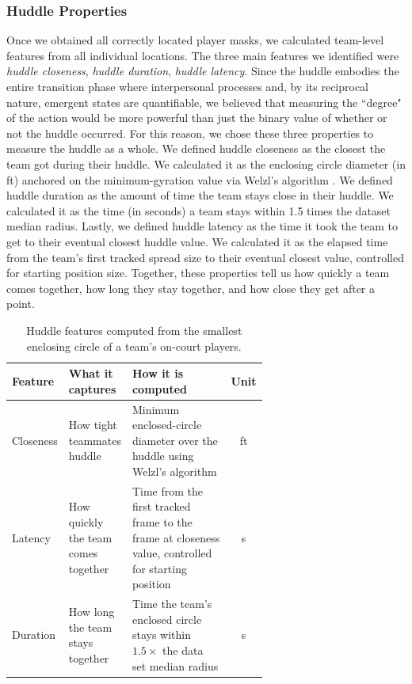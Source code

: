 \documentclass[12pt]{article}          %
\begin{document}
\subsubsection{Huddle Properties}
Once we obtained all correctly located player masks, we calculated team-level features from all individual locations. The three main features we identified were \textit{huddle closeness}, \textit{huddle duration}, \textit{huddle latency}. Since the huddle embodies the entire transition phase where interpersonal processes and, by its reciprocal nature, emergent states are quantifiable, we believed that measuring the ``degree" of the action would be more powerful than just the binary value of whether or not the huddle occurred. For this reason, we chose these three properties to measure the huddle as a whole. We defined huddle closeness as the closest the team got during their huddle. We calculated it as the enclosing circle diameter (in ft) anchored on the minimum-gyration value via Welzl's algorithm \citep{welzl1991smallest}. We defined huddle duration as the amount of time the team stays close in their huddle. We calculated it as the time (in seconds) a team stays within 1.5 times the dataset median radius. Lastly, we defined huddle latency as the time it took the team to get to their eventual closest huddle value. We calculated it as the elapsed time from the team's first tracked spread size to their eventual closest value, controlled for starting position size. Together, these properties tell us how quickly a team comes together, how long they stay together, and how close they get after a point. 

\begin{table}[htbp]
  \centering
  \small
  \renewcommand{\arraystretch}{1.3}
  \begin{tabular}{@{}l >{\raggedright\arraybackslash}p{0.22\linewidth}
                      >{\raggedright\arraybackslash}p{0.42\linewidth} c@{}}
    \hline
    \textbf{Feature} & \textbf{What it captures} & \textbf{How it is computed} & \textbf{Unit} \\
    \hline
    Closeness & How tight teammates huddle
      & Minimum enclosed-circle diameter over the huddle using Welzl's algorithm
      & ft \\
    Latency & How quickly the team comes together
      & Time from the first tracked frame to the frame at closeness value, controlled for starting position
      & s \\
    Duration & How long the team stays together
      & Time the team's enclosed circle stays within $1.5\times$ the data set median radius
      & s \\
    \hline
  \end{tabular}
  \caption{Huddle features computed from the smallest enclosing circle of a team's on-court players.}
  \label{tab:huddle_features}
\end{table}
\end{document}
